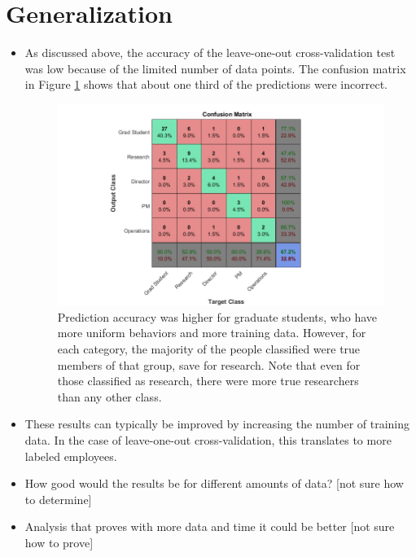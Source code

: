 \documentclass[12pt]{report}
\begin{document}
\section{Generalization}
\begin{itemize}
\item As discussed above, the accuracy of the leave-one-out cross-validation test was low because of the limited number of data points.  The confusion matrix in Figure \ref{fig:loocv_conf_plot} shows that about one third of the predictions were incorrect.  
\begin{figure}[t]
    \centering
        \includegraphics[width=.9\columnwidth,trim={1mm 4mm 1mm 3.5mm},clip]{confusion_plot}
        \vspace{-7pt}
        \caption[Leave one out cross validation results]{Prediction accuracy was higher for graduate students, who have more uniform behaviors and more training data.  However, for each category, the majority of the people classified were true members of that group, save for research.  Note that even for those classified as research, there were more true researchers than any other class.}
        \label{fig:loocv_conf_plot}
\end{figure}
\item These results can typically be improved by increasing the number of training data. In the case of leave-one-out cross-validation, this translates to more labeled employees.
\item How good would the results be for different amounts of data?  [not sure how to determine]
\item Analysis that proves with more data and time it could be better [not sure how to prove]
\end{itemize}
\end{document}
